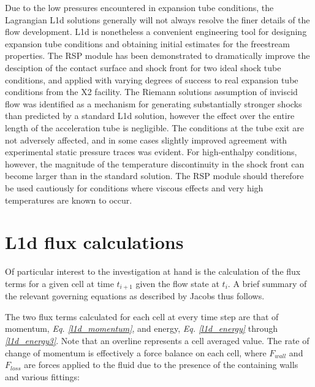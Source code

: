 \documentclass[a4paper,10pt]{article}
\begin{document}
Due to the low pressures encountered in expansion tube conditions, the Lagrangian L1d solutions generally will not always resolve the finer details of the flow development.  L1d is nonetheless a convenient engineering tool for designing expansion tube conditions and obtaining initial estimates for the freestream properties.  The RSP module has been demonstrated to dramatically improve the desciption of the contact surface and shock front for two ideal shock tube conditions, and applied with varying degrees of success to real expansion tube conditions from the X2 facility.  The Riemann solutions assumption of inviscid flow was identified as a mechanism for generating substantially stronger shocks than predicted by a standard L1d solution, however the effect over the entire length of the acceleration tube is negligible.  The conditions at the tube exit are not adversely affected, and in some cases slightly improved agreement with experimental static pressure traces was evident.  For high-enthalpy conditions, however, the magnitude of the temperature discontinuity in the shock front can become larger than in the standard solution.  The RSP module should therefore be used cautiously for conditions where viscous effects and very high temperatures are known to occur. 
\newpage

\nocite{*}



\newpage

\appendix

\section{L1d flux calculations}
\label{appendix_A}

Of particular interest to the investigation at hand is the calculation of the flux terms for a given cell at time $t_{i+1}$ given the flow state at $t_{i}$.  A brief summary of the relevant governing equations as described by Jacobs \cite{jacobs_98b} thus follows.
\par
\medskip
The two flux terms calculated for each cell at every time step are that of momentum, \emph{Eq. \ref{l1d_momentum}}, and energy, \emph{Eq. \ref{l1d_energy}} through \emph{\ref{l1d_energy3}}.  Note that an overline represents a cell averaged value.  The rate of change of momentum is effectively a force balance on each cell, where $F_{wall}$ and $F_{loss}$ are forces applied to the fluid due to the presence of the containing walls and various fittings:
\end{document}
